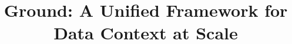 \documentclass{sig-alternate}
\begin{document}
\newcommand{\smallitem}[1]{\vspace{1em}\noindent\textbf{#1}}
\newcommand{\smallitembot}{\vspace{1em}\noindent}


\newcommand{\jmh}[1]{{\textcolor{red}{[[#1 -- jmh]]}}}
\newcommand{\joey}[1]{{\textcolor{cyan}{[[#1 -- jeg]]}}}
\newcommand{\msd}[1]{{\textcolor{green}{[[#1 -- msd]]}}}
\newcommand{\akon}[1]{{\textcolor{orange}{[[#1 -- akon]]}}}

\newcommand{\vikram}[1]{{\textcolor{blue}{[[#1 --vikram]]}}}

\newcommand{\core}{version graph\xspace}
\newcommand{\mantle}{model graph\xspace}
\newcommand{\crust}{lineage graph\xspace}
\newcommand{\Core}{Version Graph\xspace}
\newcommand{\Mantle}{Model Graph\xspace}
\newcommand{\Crust}{Lineage Graph\xspace}

\newcommand{\version}{\kw{Version}\xspace}
\newcommand{\richversion}{\kw{RichVersion}\xspace}
\newcommand{\thing}{\kw{Item}\xspace}
\newcommand{\node}{\kw{Node}\xspace}
\newcommand{\edge}{\kw{Edge}\xspace}
\newcommand{\structure}{\kw{Structure}\xspace}
\newcommand{\graph}{\kw{Graph}\xspace}
\newcommand{\TVID}{\kw{TVID}\xspace}
\newcommand{\gtag}{\kw{Tag}\xspace}
\newcommand{\uri}{\kw{URI}\xspace}

\newcommand{\versiongraph}{versiongraph\xspace}
\newcommand{\modelgraph}{modelgraph\xspace}
\newcommand{\lineagegraph}{lineagegraph\xspace}
\newcommand{\versiongraphs}{versiongraphs\xspace}
\newcommand{\modelgraphs}{modelgraphs\xspace}
\newcommand{\lineagegraphs}{lineagegraphs\xspace}
\newcommand{\groundwire}{GroundWire\xspace}

\newcommand{\kw}[1]{{\small\texttt{#1}}}
\newcommand{\lilemail}[1]{\email{\small #1}}



\title{Ground: A Unified Framework for Data Context at Scale }
\end{document}
